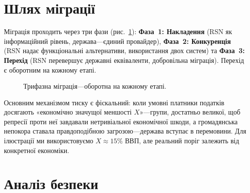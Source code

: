\documentclass[11pt,a4paper,twocolumn]{article}
\begin{document}
\section{Шлях міграції}

Міграція проходить через три фази (рис.~\ref{fig:migration}): \textbf{Фаза~1: Накладення} (RSN як інформаційний рівень, держава---єдиний провайдер), \textbf{Фаза~2: Конкуренція} (RSN надає функціональні альтернативи, використання двох систем) та \textbf{Фаза~3: Перехід} (RSN перевершує державні еквіваленти, добровільна міграція). Перехід є оборотним на кожному етапі.

\begin{figure}[ht]
\centering
{}
\caption{Трифазна міграція---оборотна на кожному етапі.}
\label{fig:migration}
\end{figure}

Основним механізмом тиску є фіскальний: коли умовні платники податків досягають «економічно значущої меншості $X$»---групи, достатньо великої, щоб репресії проти неї завдавали нетривіальної економічної шкоди, а громадянська непокора ставала правдоподібною загрозою---держава вступає в перемовини. Для ілюстрації ми використовуємо $X \approx 15\%$ ВВП, але реальний поріг залежить від конкретної економіки.

\section{Аналіз безпеки}
\end{document}

